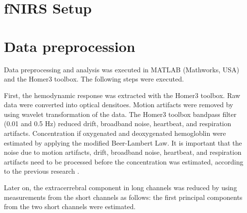  

\section {fNIRS Setup}

\section {Data preprocession}
Data preprocessing and analysis was executed in MATLAB (Mathworks, USA) and the Homer3 toolbox. The following steps were executed.

First, the hemodynamic response was extracted with the Homer3 toolbox. Raw data were converted into optical densitoes. Motion artifacts were removed by using wavelet transformation of the data. The Homer3 toolbox bandpass filter (0.01 and 0.5 Hz) reduced drift, broadband noise, heartbeat, and respiration artifacts. Concentration if oxygenated and deoxygenated hemogloblin were estimated by applying the modified Beer-Lambert Law. It is important that the noise due to motion artifacts, drift, broadband noise, heartbeat, and respiration artifacts need to be processed before the concentration was estimated, according to the previous research \cite {Huppert:09}.

Later on, the extracerrebral component in long channels was reduced by using measurements from the short channels as follows: the first principal components from the two short channels were estimated.


